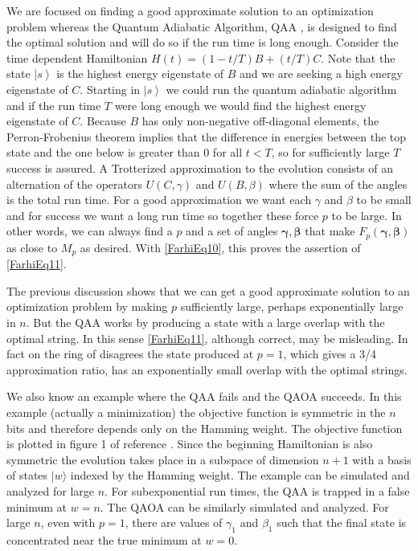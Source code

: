 \documentclass[t11pt,reprint,preprint,preprintnumbers]{revtex4}
\newcommand{\ket}[1]{\left|#1\right\rangle}
\begin{document}
We are focused on finding a good approximate solution to an optimization problem whereas the Quantum Adiabatic Algorithm, QAA \cite{farhi-2000},  is designed to find the optimal solution and will do so if the run time is long enough. Consider the time dependent Hamiltonian $H(t)=(1-t/T) B+(t/T) C$.  Note that the state $\ket{s}$  is the highest energy eigenstate of $B$ and we are seeking a high energy eigenstate of $C$.  Starting in $\ket{s}$ we could run the quantum adiabatic algorithm and if the run time $T$ were long enough we would find the highest energy eigenstate of $C$.  Because $B$ has only non-negative off-diagonal elements, the Perron-Frobenius theorem implies that the difference in energies between the top state and the one below is greater than 0 for all $t < T$, so for sufficiently large $T$ success is assured.   A Trotterized approximation to the evolution consists of an alternation of the operators $U(C,\gamma)$ and $U(B,\beta)$ where the sum of the angles is the total run time.  For a good approximation we want each $\gamma$ and $\beta$ to be small and for success we want a long run time so together these force $p$ to be large. In other words, we can always find a $p$ and a set of angles $\boldsymbol{\gamma}, \boldsymbol{\beta}$ that make $F_p(\boldsymbol{\gamma}, \boldsymbol{\beta})$ as close to $M_p$ as desired.   With \eqref{FarhiEq10}, this proves the assertion of \eqref{FarhiEq11}.  

The previous discussion shows that we can get a good approximate solution to an optimization problem by making $p$ sufficiently large, perhaps exponentially large in $n$.  But the QAA works by producing a state with a large overlap with the optimal string. In this sense \eqref{FarhiEq11}, although  correct, may be misleading.  In fact on the ring of disagrees the state produced at $p=1$, which gives a 3/4 approximation ratio, has an exponentially small overlap with the optimal strings.  

We also know an example where the QAA fails and the QAOA succeeds. In this example (actually a minimization) the objective function is symmetric in the $n$ bits and therefore depends only on the Hamming weight. The objective function is plotted in figure 1 of reference \cite{farhi-2002}. Since the beginning Hamiltonian is also symmetric the evolution takes place in a subspace of dimension $n+1$ with a basis of states $|w\rangle$ indexed by the Hamming weight. The example can be simulated and analyzed for large $n$. For subexponential run times, the QAA is trapped in a false minimum at $w=n$. The QAOA can be similarly simulated and analyzed.  For large $n$, even with $p=1$, there are values of $\gamma_1$ and $\beta_1$ such that the final state is concentrated near the true minimum at $w=0$.
\end{document}
